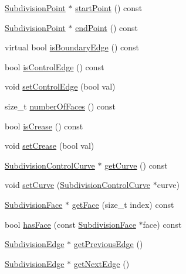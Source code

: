 \begin{DoxyCompactItemize}
\hyperlink{classShipCAD_1_1SubdivisionPoint}{Subdivision\+Point} $\ast$ \hyperlink{classShipCAD_1_1SubdivisionEdge_aa6e28532f3ecc1610813844dfb385deb}{start\+Point} () const 
\item 
\hyperlink{classShipCAD_1_1SubdivisionPoint}{Subdivision\+Point} $\ast$ \hyperlink{classShipCAD_1_1SubdivisionEdge_aa65e2e10929c52fd05b6bb90317977dc}{end\+Point} () const 
\item 
virtual bool \hyperlink{classShipCAD_1_1SubdivisionEdge_ae1b7c9b23301bed5ce49abae834bd0f0}{is\+Boundary\+Edge} () const 
\item 
bool \hyperlink{classShipCAD_1_1SubdivisionEdge_afcf8f9f766c80cd90045194cde86d4c8}{is\+Control\+Edge} () const 
\item 
void \hyperlink{classShipCAD_1_1SubdivisionEdge_af48a9311daf8f3607e181922162e8c7b}{set\+Control\+Edge} (bool val)
\item 
size\+\_\+t \hyperlink{classShipCAD_1_1SubdivisionEdge_ac4004284f7ab47437b9a1fe7adbde70d}{number\+Of\+Faces} () const 
\item 
bool \hyperlink{classShipCAD_1_1SubdivisionEdge_ae649fe7169f64a8e5ede1fbb36a176fa}{is\+Crease} () const 
\item 
void \hyperlink{classShipCAD_1_1SubdivisionEdge_ad0313b8844a81c5802533376a09fce99}{set\+Crease} (bool val)
\item 
\hyperlink{classShipCAD_1_1SubdivisionControlCurve}{Subdivision\+Control\+Curve} $\ast$ \hyperlink{classShipCAD_1_1SubdivisionEdge_a46dd1e0aab4ca8b64c5db56d1796dd8e}{get\+Curve} () const 
\item 
void \hyperlink{classShipCAD_1_1SubdivisionEdge_a445c08836100060818c129ea7c694234}{set\+Curve} (\hyperlink{classShipCAD_1_1SubdivisionControlCurve}{Subdivision\+Control\+Curve} $\ast$curve)
\item 
\hyperlink{classShipCAD_1_1SubdivisionFace}{Subdivision\+Face} $\ast$ \hyperlink{classShipCAD_1_1SubdivisionEdge_afe3de434f13adfde22f2c209197902de}{get\+Face} (size\+\_\+t index) const 
\item 
bool \hyperlink{classShipCAD_1_1SubdivisionEdge_acbadf30c024c432571304aa4b787036b}{has\+Face} (const \hyperlink{classShipCAD_1_1SubdivisionFace}{Subdivision\+Face} $\ast$face) const 
\item 
\hyperlink{classShipCAD_1_1SubdivisionEdge}{Subdivision\+Edge} $\ast$ \hyperlink{classShipCAD_1_1SubdivisionEdge_a7c1fe2cad6e7b8a0e532768b4a395137}{get\+Previous\+Edge} ()
\item 
\hyperlink{classShipCAD_1_1SubdivisionEdge}{Subdivision\+Edge} $\ast$ \hyperlink{classShipCAD_1_1SubdivisionEdge_aebb50514ff119a1484f7c7505a527a2b}{get\+Next\+Edge} ()

\end{DoxyCompactItemize}

